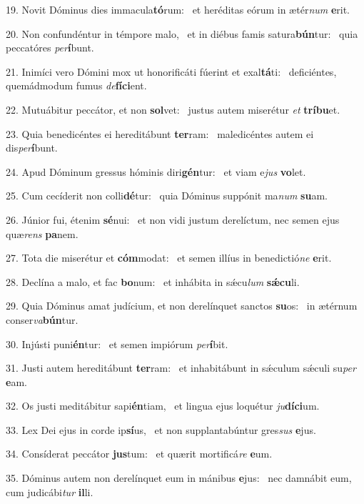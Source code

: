 19. Novit Dóminus dies immacula\textbf{tó}rum: \ast\  et heréditas eórum in ætér\textit{num} \textbf{e}rit.\

20. Non confundéntur in témpore malo, \dag\  et in diébus famis satura\textbf{bún}tur: \ast\  quia peccatóres \textit{per}\textbf{í}bunt.\

21. Inimíci vero Dómini mox ut honorificáti fúerint et exal\textbf{tá}ti: \ast\  deficiéntes, quemádmodum fumus \textit{de}\textbf{fí}\textbf{ci}ent.\

22. Mutuábitur peccátor, et non \textbf{sol}vet: \ast\  justus autem miserétur \textit{et} \textbf{trí}\textbf{bu}et.\

23. Quia benedicéntes ei hereditábunt \textbf{ter}ram: \ast\  maledicéntes autem ei dis\textit{per}\textbf{í}bunt.\

24. Apud Dóminum gressus hóminis diri\textbf{gén}tur: \ast\  et viam e\textit{jus} \textbf{vo}let.\

25. Cum cecíderit non colli\textbf{dé}tur: \ast\  quia Dóminus suppónit ma\textit{num} \textbf{su}am.\

26. Júnior fui, étenim \textbf{sé}nui: \ast\  et non vidi justum derelíctum, nec semen ejus quæ\textit{rens} \textbf{pa}nem.\

27. Tota die miserétur et \textbf{cóm}modat: \ast\  et semen illíus in benedictió\textit{ne} \textbf{e}rit.\

28. Declína a malo, et fac \textbf{bo}num: \ast\  et inhábita in sǽcu\textit{lum} \textbf{sǽ}\textbf{cu}li.\

29. Quia Dóminus amat judícium, et non derelínquet sanctos \textbf{su}os: \ast\  in ætérnum conser\textit{va}\textbf{bún}tur.\

30. Injústi puni\textbf{én}tur: \ast\  et semen impiórum \textit{per}\textbf{í}bit.\

31. Justi autem hereditábunt \textbf{ter}ram: \ast\  et inhabitábunt in sǽculum sǽculi su\textit{per} \textbf{e}am.\

32. Os justi meditábitur sapi\textbf{én}tiam, \ast\  et lingua ejus loquétur \textit{ju}\textbf{dí}\textbf{ci}um.\

33. Lex Dei ejus in corde ip\textbf{sí}us, \ast\  et non supplantabúntur gres\textit{sus} \textbf{e}jus.\

34. Consíderat peccátor \textbf{jus}tum: \ast\  et quærit mortificá\textit{re} \textbf{e}um.\

35. Dóminus autem non derelínquet eum in mánibus \textbf{e}jus: \ast\  nec damnábit eum, cum judicábi\textit{tur} \textbf{il}li.\

